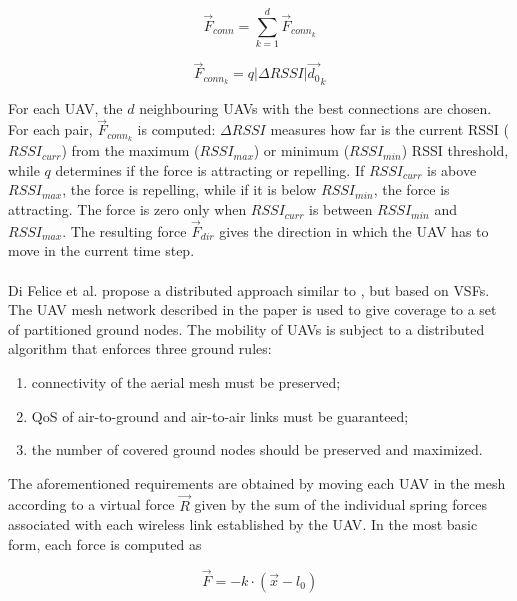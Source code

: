 \begin{equation}
	\overrightarrow{F}_{conn} = \sum\limits_{k=1}^{d} \overrightarrow{F}_{conn_k}
\end{equation} 

\begin{equation}
	\overrightarrow{F}_{conn_k} = q |\Delta RSSI| \overrightarrow{d_0}_k
\end{equation}

For each \gls{UAV}, the $d$ neighbouring \glspl{UAV} with the best connections are chosen. For each pair, $\overrightarrow{F}_{conn_k}$ is computed: $\Delta RSSI$ measures how far is the current RSSI ($RSSI_{curr}$) from the maximum ($RSSI_{max}$) or minimum ($RSSI_{min}$) RSSI threshold, while $q$ determines if the force is attracting or repelling. If $RSSI_{curr}$ is above $RSSI_{max}$, the force is repelling, while if it is below $RSSI_{min}$, the force is attracting. The force is zero only when $RSSI_{curr}$ is between $RSSI_{min}$ and $RSSI_{max}$. The resulting force $\overrightarrow{F}_{dir}$ gives the direction in which the \gls{UAV} has to move in the current time step. \\ \\
Di Felice et al. \cite{ref:soa-fanet2} propose a distributed approach similar to \cite{prevCit}, but based on \glspl{VSF}. The \gls{UAV} mesh network described in the paper is used to give coverage to a set of partitioned ground nodes. The mobility of \glspl{UAV} is subject to a distributed algorithm that enforces three ground rules: 

\begin{enumerate}[label=(\roman*)]
	\item connectivity of the aerial mesh must be preserved;
	\item QoS of air-to-ground and air-to-air links must be guaranteed;
	\item the number of covered ground nodes should be preserved and maximized.
\end{enumerate}

The aforementioned requirements are obtained by moving each \gls{UAV} in the mesh according to a virtual force $\overrightarrow{R}$ given by the sum of the individual spring forces associated with each wireless link established by the \gls{UAV}. In the most basic form, each force is computed as

\begin{equation}
	\overrightarrow{F} = -k \cdot (\overrightarrow{x} - l_0)
\end{equation} 

